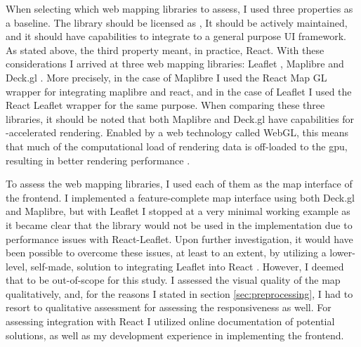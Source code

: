 When selecting which web mapping libraries to assess,
I used three properties as a baseline.
The library should be licensed as ,
It should be actively maintained,
and it should have capabilities to integrate to a general purpose UI framework.
As stated above, the third property meant, in practice, React.
With these considerations I arrived at three web mapping libraries:
Leaflet \parencite{leaflet}, Maplibre \parencite{maplibre} and Deck.gl \parencite{deckgl}.
More precisely, in the case of Maplibre I used the React Map GL wrapper
\parencite{reactmapgl} for integrating maplibre and react, and in the case of Leaflet
I used the React Leaflet wrapper \parencite{reactleaflet} for the same purpose.
When comparing these three libraries, it should be noted that
both Maplibre and Deck.gl have capabilities for -accelerated rendering.
Enabled by a web technology called WebGL, this means that much of the computational load
of rendering data is off-loaded to the \acrshort{gpu},
resulting in better rendering performance \parencite{ang2014, mia2017}.

To assess the web mapping libraries,
I used each of them as the map interface of the frontend. %
I implemented a feature-complete map interface using both
Deck.gl and Maplibre, but with Leaflet I stopped at a very minimal working example
as it became clear that the library would not be used in the implementation due
to performance issues with React-Leaflet.
Upon further investigation, it would have been possible to
overcome these issues, at least to an extent,
by utilizing a lower-level, self-made,
solution to integrating Leaflet into React \parencite{gaj2023}.
However, I deemed that to be out-of-scope for this study.
I assessed the visual quality of the map qualitatively, and,
for the reasons I stated in section \ref{sec:preprocessing},
I had to resort to qualitative assessment
for assessing the responsiveness as well.
For assessing integration with React
I utilized online documentation of potential solutions,
as well as my development experience in implementing the frontend.

